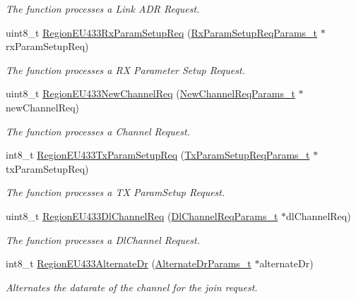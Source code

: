 \begin{DoxyCompactItemize}
\begin{DoxyCompactList}\small\item\em The function processes a Link A\+DR Request. \end{DoxyCompactList}\item 
uint8\+\_\+t \hyperlink{group__REGIONEU433_ga0aaed1ad836262927f03ec9f8b63674d}{Region\+E\+U433\+Rx\+Param\+Setup\+Req} (\hyperlink{group__REGION_ga7165f282c670c728c36d534df2285157}{Rx\+Param\+Setup\+Req\+Params\+\_\+t} $\ast$rx\+Param\+Setup\+Req)
\begin{DoxyCompactList}\small\item\em The function processes a RX Parameter Setup Request. \end{DoxyCompactList}\item 
uint8\+\_\+t \hyperlink{group__REGIONEU433_ga1df9d3b633c355a6b1d2b7fc1e0e217b}{Region\+E\+U433\+New\+Channel\+Req} (\hyperlink{group__REGION_gae2abcdb6dbb843c9faf5fd3009eca9d6}{New\+Channel\+Req\+Params\+\_\+t} $\ast$new\+Channel\+Req)
\begin{DoxyCompactList}\small\item\em The function processes a Channel Request. \end{DoxyCompactList}\item 
int8\+\_\+t \hyperlink{group__REGIONEU433_ga3536c80fcee7f9f673bce7e3dbd50fd2}{Region\+E\+U433\+Tx\+Param\+Setup\+Req} (\hyperlink{group__REGION_ga26836ef2996e70410e42ef471073f855}{Tx\+Param\+Setup\+Req\+Params\+\_\+t} $\ast$tx\+Param\+Setup\+Req)
\begin{DoxyCompactList}\small\item\em The function processes a TX Param\+Setup Request. \end{DoxyCompactList}\item 
uint8\+\_\+t \hyperlink{group__REGIONEU433_ga245f30ef549f49611ca2513a3d931033}{Region\+E\+U433\+Dl\+Channel\+Req} (\hyperlink{group__REGION_gae0d608ff1f8ea0a430e4f9a4c38ec7f3}{Dl\+Channel\+Req\+Params\+\_\+t} $\ast$dl\+Channel\+Req)
\begin{DoxyCompactList}\small\item\em The function processes a Dl\+Channel Request. \end{DoxyCompactList}\item 
int8\+\_\+t \hyperlink{group__REGIONEU433_ga3fdffc76cad694d27a71a38769cfee85}{Region\+E\+U433\+Alternate\+Dr} (\hyperlink{group__REGION_ga001ea4338d1c83f4c785b49d7ad2d696}{Alternate\+Dr\+Params\+\_\+t} $\ast$alternate\+Dr)
\begin{DoxyCompactList}\small\item\em Alternates the datarate of the channel for the join request. \end{DoxyCompactList}\item 

\end{DoxyCompactItemize}
